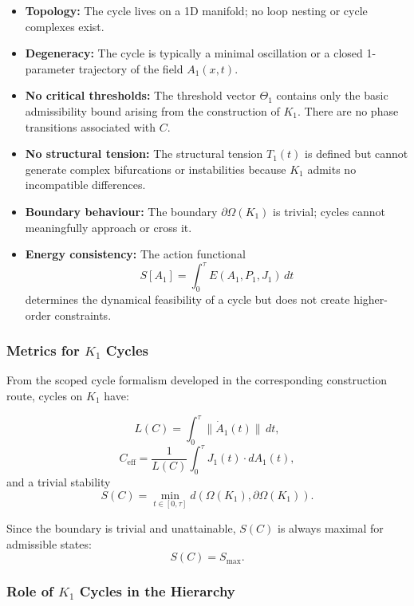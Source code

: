 \begin{itemize}
  \item \textbf{Topology:}
        The cycle lives on a 1D manifold; no loop nesting or cycle
        complexes exist.

  \item \textbf{Degeneracy:}
        The cycle is typically a minimal oscillation or a closed
        1-parameter trajectory of the field $A_1(x,t)$.

  \item \textbf{No critical thresholds:}
        The threshold vector $\Theta_1$ contains only the basic
        admissibility bound arising from the construction of $K_1$.
        There are no phase transitions associated with $C$.

  \item \textbf{No structural tension:}
        The structural tension
        $T_1(t)$ is defined but cannot generate complex bifurcations or
        instabilities because $K_1$ admits no incompatible differences.

  \item \textbf{Boundary behaviour:}
        The boundary $\partial\Omega(K_1)$ is trivial; cycles cannot
        meaningfully approach or cross it.

  \item \textbf{Energy consistency:}
        The action functional
        \[
          S[A_1] = \int_0^\tau E(A_1,P_1,J_1)\, dt
        \]
        determines the dynamical feasibility of a cycle but does not
        create higher-order constraints.
\end{itemize}

\subsubsection{Metrics for \texorpdfstring{$K_1$}{K_1} Cycles}

From the scoped cycle formalism developed in the corresponding construction route, cycles on $K_1$
have:

\[
  L(C) = \int_0^\tau \| \dot{A}_1(t) \|\, dt,
\]
\[
  C_{\mathrm{eff}} =
    \frac{1}{L(C)} \int_0^\tau J_1(t)\cdot dA_1(t),
\]
and a trivial stability
\[
  S(C) = \min_{t\in[0,\tau]} d(\Omega(K_1),\partial\Omega(K_1)).
\]

Since the boundary is trivial and unattainable, $S(C)$ is always
maximal for admissible states:
\[
  S(C) = S_{\max}.
\]

\subsubsection{Role of \texorpdfstring{$K_1$}{K_1} Cycles in the Hierarchy}


